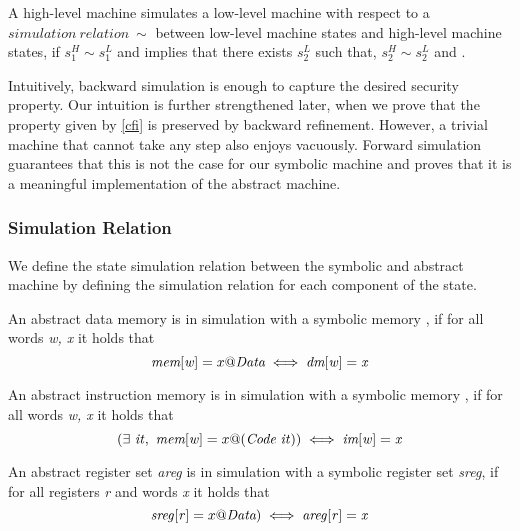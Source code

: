 \begin{definition}
\label{fwd_simulation_LH}
  A high-level machine simulates a low-level machine with respect to a
  $simulation~relation~\sim$ between low-level machine states and
  high-level machine states, if $s^H_1 \sim s_1^L$ and
   implies that there exists $s^L_2$ such that,
  $s^H_2 \sim s^L_2$ and .
\end{definition}

Intuitively, backward simulation is enough to capture the desired
security property. Our intuition is further strengthened later, when
we prove that the \CFI property given by \cref{cfi} is preserved by
backward refinement. However, a trivial machine that cannot take any step
also enjoys \CFI vacuously. Forward simulation guarantees that this is not
the case for our symbolic machine and proves that it is a meaningful
implementation of the abstract machine.

\subsubsection{Simulation Relation}
\label{sec:sim_relation}

We define the state simulation relation between the symbolic and
abstract machine by defining the simulation relation for each
component of the state.

\begin{definition}\label{refine_dmemory}
  An abstract data memory \dmem is in simulation with a
  symbolic memory \mem, if for all words \textit{w, x} it holds
  that 
  $$\textit{mem}[\mathit{w}] = x@\textit{Data}
  \iff \textit{dm}[\mathit{w}] = \mathit{x}$$
\end{definition}

\begin{definition}
  \label{refine_imemory}
  An abstract instruction memory \imem is in simulation with a
  symbolic memory \mem, if for all words \textit{w, x} it holds
  that
  $$(\exists~\mathit{it}, ~ \textit{mem}[\mathit{w}] = 
  x@(\textit{Code}~\mathit{it}))
  \iff \textit{im}[\mathit{w}] = \mathit{x}$$
\end{definition}

\begin{definition}
  \label{refine_registers}
  An abstract register set \textit{areg} is in simulation with a
  symbolic register set \textit{sreg}, if for all registers \textit{r} and words
  \textit{x} it holds that
  $$ \mathit{sreg}[\mathit{r}] = x@\textit{Data})
  \iff \mathit{areg}[\mathit{r}] = \mathit{x}$$
\end{definition}

